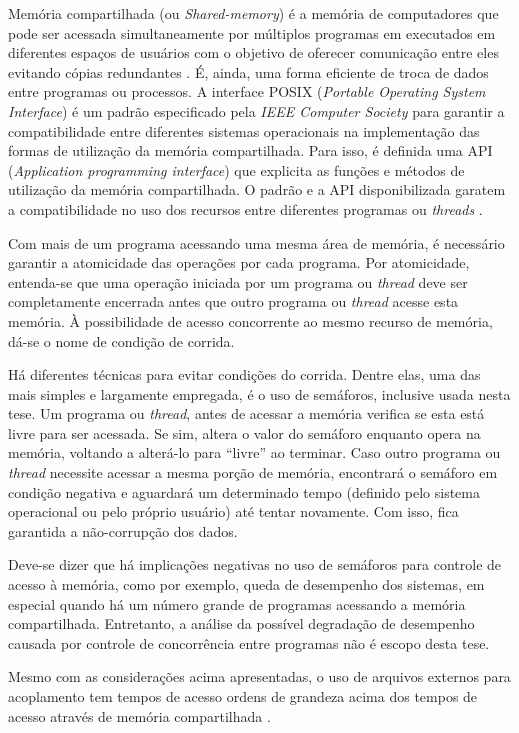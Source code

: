 Memória compartilhada (ou \textit{Shared-memory}) é a memória de computadores que pode ser
acessada simultaneamente por múltiplos programas em executados em diferentes
espaços de usuários com o objetivo de oferecer comunicação entre
eles evitando cópias redundantes \cite{Robbins2003}. É, ainda, uma forma eficiente
de troca de dados entre programas ou processos. A interface POSIX
(\textit{Portable Operating System Interface}) \cite{Walli1995} é um
padrão especificado pela \textit{IEEE Computer Society} para garantir
a compatibilidade entre diferentes sistemas operacionais na implementação
das formas de utilização da memória compartilhada. Para isso, é definida
uma API (\textit{Application programming interface}) que explicita as funções
e métodos de utilização da memória compartilhada. O padrão e a API disponibilizada
garatem a compatibilidade no uso dos recursos entre diferentes programas ou \textit{threads}
\cite{Atlidakis2016}.

Com mais de um programa acessando uma mesma área de memória, é necessário garantir a atomicidade
das operações por cada programa. Por atomicidade, entenda-se que uma operação iniciada por um
programa ou \textit{thread} deve ser completamente encerrada antes que outro programa ou
\textit{thread} acesse esta memória. À possibilidade de acesso concorrente ao mesmo recurso
de memória, dá-se o nome de condição de corrida.

Há diferentes técnicas para evitar condições do corrida. Dentre elas, uma das mais simples e
largamente empregada, é o uso de semáforos, inclusive usada nesta tese.
Um programa ou \textit{thread}, antes de acessar a memória
verifica se esta está livre para ser acessada. Se sim, altera o valor do semáforo enquanto opera na
memória, voltando a alterá-lo para ``livre'' ao terminar. Caso outro programa ou \textit{thread}
necessite acessar a mesma porção de memória, encontrará o semáforo em condição negativa e aguardará
um determinado tempo (definido pelo sistema operacional ou pelo próprio usuário) até tentar novamente.
Com isso, fica garantida a não-corrupção dos dados.

Deve-se dizer que há implicações negativas no uso de semáforos para controle de acesso à memória,
como por exemplo, queda de desempenho dos sistemas, em especial quando há um número grande
de programas acessando a memória compartilhada. Entretanto, a análise da possível degradação
de desempenho causada por controle de concorrência entre programas não é escopo desta tese.

Mesmo com as considerações acima apresentadas, o uso de arquivos externos para acoplamento
\cite{Hummel2016} tem tempos de acesso ordens de grandeza acima dos tempos de acesso
através de memória compartilhada \cite{Theler2013}.

